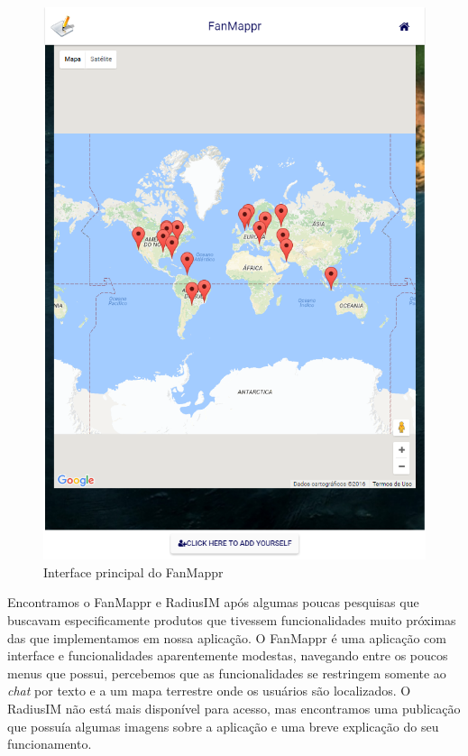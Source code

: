 \begin{figure}[!b]
	\centering
	\includegraphics[scale=0.5]{imagens/fanmappr.png}
	\caption{\small Interface principal do FanMappr}
	\label{fig:fanmappr-principal}
\end{figure}

Encontramos o FanMappr e RadiusIM após algumas poucas pesquisas que buscavam especificamente produtos que tivessem funcionalidades muito próximas das que implementamos em nossa aplicação. O FanMappr é uma aplicação com interface e funcionalidades aparentemente modestas, navegando entre os poucos menus que possui, percebemos que as funcionalidades se restringem somente ao \textit{chat} por texto e a um mapa terrestre onde os usuários são localizados. O RadiusIM não está mais disponível para acesso, mas encontramos uma publicação \cite{radiusim} que possuía algumas imagens sobre a aplicação e uma breve explicação do seu funcionamento.

